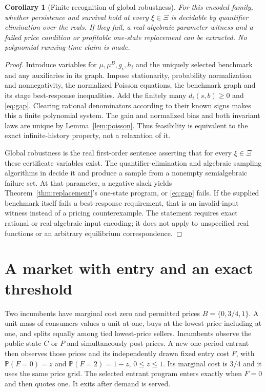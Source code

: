 \documentclass[11pt,a4paper]{article}
\newtheorem{corollary}[theorem]{Corollary}
\newcommand{\Prob}{\mathbb P}
\begin{document}
\begin{corollary}[Finite recognition of global robustness]\label{cor:qe}
For this encoded family, whether persistence and survival hold at every
$\xi\in\Xi$ is decidable by quantifier elimination over the reals. If they
fail, a real-algebraic parameter witness and a failed price condition or
profitable one-state replacement can be extracted. No polynomial running-time
claim is made.
\end{corollary}
\begin{proof}
Introduce variables for $\mu,\mu^B,g_i,h_i$ and the uniquely selected benchmark
and any auxiliaries in its graph. Impose stationarity, probability normalization
and nonnegativity, the normalized Poisson equations, the benchmark graph and
its stage best-response inequalities. Add the finitely many
$d_i(s,b)\geq0$ and \eqref{eq:gap}. Clearing rational denominators according
to their known signs makes this a finite polynomial system. The gain and
normalized bias and both invariant laws are unique by
Lemma~\ref{lem:poisson}. Thus feasibility is equivalent to the exact
infinite-history property, not a relaxation of it.

Global robustness is the real first-order sentence asserting that for every
$\xi\in\Xi$ these certificate variables exist. The quantifier-elimination
and algebraic sampling algorithms in \cite[Sections 13.1 and 14.2]{bpr}
decide it and produce a sample from a nonempty semialgebraic failure set.
At that parameter, a negative slack yields Theorem~\ref{thm:replacement}'s
one-state program, or \eqref{eq:gap} fails. If the supplied benchmark itself
fails a best-response requirement, that is an invalid-input witness instead
of a pricing counterexample. The statement requires exact rational or
real-algebraic input encoding; it does not apply to unspecified real functions
or an arbitrary equilibrium correspondence.
\end{proof}

\section{A market with entry and an exact threshold}\label{sec:example}
Two incumbents have marginal cost zero and permitted prices $B=\{0,3/4,1\}$.
A unit mass of consumers values a unit at one, buys at the lowest price including
at one, and splits equally among tied lowest-price sellers. Incumbents observe
the public state $C$ or $P$ and simultaneously post prices. A new one-period
entrant then observes those prices and its independently drawn fixed entry cost
$F$, with $\Prob(F=0)=z$ and $\Prob(F=2)=1-z$, $0\leq z\leq1$.
Its marginal cost is $3/4$ and it uses the same price grid. The selected entrant
program enters exactly when $F=0$ and then quotes one. It exits after demand
is served.
\end{document}
